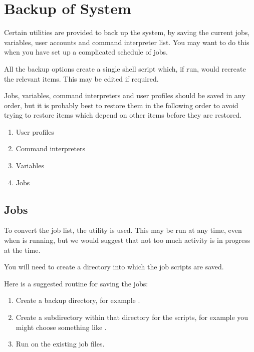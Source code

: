 \chapter{Backup of \manualProduct{} System}
\label{chp:backup-of-system}
Certain utilities are provided to back up the \ProductName{} system, by saving
the current jobs, variables, user accounts and command interpreter
list. You may want to do this when you have set up a complicated
schedule of jobs. 

All the backup options create a single shell script which, if run, would
recreate the relevant items. This may be edited if required.

Jobs, variables, command interpreters and user profiles should be saved
in any order, but it is probably best to restore them in the following order to avoid trying to restore items which
depend on other items before they are restored.

\begin{enumerate}
\item User profiles
\item Command interpreters
\item Variables
\item Jobs
\end{enumerate}

\section{Jobs}
To convert the job list, the utility \PrXbCjlist{} is used. This may be run at any time, even when \ProductName{} is running, but
we would suggest that not too much activity is in progress at the time.


You will need to create a directory into which the job scripts are saved.

Here is a suggested routine for saving the jobs:

\begin{enumerate}
\item Create a backup directory, for example .
\item Create a subdirectory within that directory for the scripts, for example you might choose something like
.
\item Run \PrXbCjlist{} on the existing job files.
\end{enumerate}

